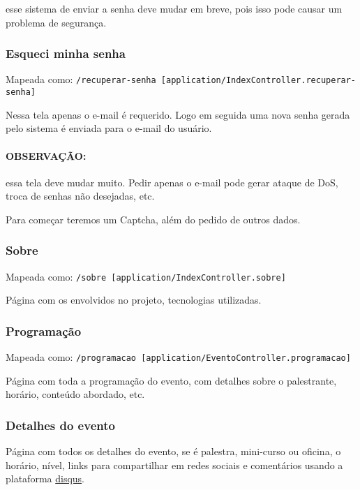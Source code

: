 esse sistema de enviar a senha deve mudar em breve, pois isso pode
causar um problema de segurança.

\subsubsection{Esqueci minha senha \label{esqueci-senha}}

Mapeada como:
\texttt{/recuperar-senha {[}application/IndexController.recuperar-senha{]}}

Nessa tela apenas o e-mail é requerido. Logo em seguida uma nova senha
gerada pelo sistema é enviada para o e-mail do usuário.

\paragraph{OBSERVAÇÃO:}

essa tela deve mudar muito. Pedir apenas o e-mail pode gerar ataque de
DoS, troca de senhas não desejadas, etc.

Para começar teremos um Captcha, além do pedido de outros dados.

\subsubsection{Sobre \label{sobre}}

Mapeada como: \texttt{/sobre {[}application/IndexController.sobre{]}}

Página com os envolvidos no projeto, tecnologias utilizadas.

\subsubsection{Programação \label{programacao}}

Mapeada como:
\texttt{/programacao {[}application/EventoController.programacao{]}}

Página com toda a programação do evento, com detalhes sobre o
palestrante, horário, conteúdo abordado, etc.

\subsubsection{Detalhes do evento \label{evento}}

Página com todos os detalhes do evento, se é palestra, mini-curso ou
oficina, o horário, nível, links para compartilhar em redes sociais e
comentários usando a plataforma \href{http://disqus.com/}{disqus}.

